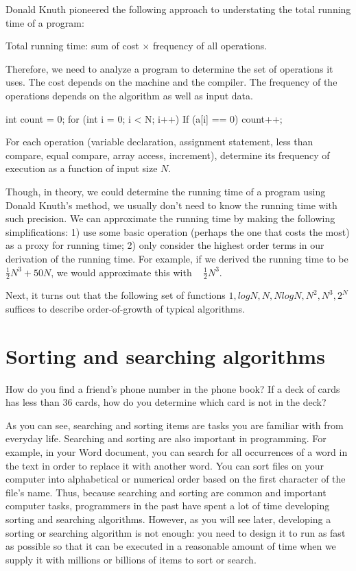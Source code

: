 Donald Knuth pioneered the following approach to understating the total running time of a program:

Total running time: sum of cost $\times$ frequency of all operations.

Therefore, we need to analyze a program to determine the set of operations it uses. The cost depends on the machine and the compiler. The frequency of the operations depends on the algorithm as well as input data. 

\begin{exercise}
\begin{code}
int count = 0;
for (int i = 0; i < N; i++)
	If (a[i] == 0)
		count++;
\end{code}

For each operation (variable declaration, assignment statement, less than compare, equal compare, array access, increment), determine its frequency of execution as a function of input size $N$.

\end{exercise}



Though, in theory, we could determine the running time of a program using Donald Knuth’s method, we usually don’t need to know the running time with such precision. We can approximate the running time by making the following simplifications: 1) use some basic operation (perhaps the one that costs the most) as a proxy for running time; 2) only consider the highest order terms in our derivation of the running time. For example, if we derived the running time to be $\frac{1}{2}N^3 + 50 N$, we would approximate this with ~ $\frac{1}{2}N^3$.

Next, it turns out that the following set of functions 
$1, logN, N, NlogN, N^2, N^3, 2^N$
suffices to describe order-of-growth of typical algorithms. 


\section{Sorting and searching algorithms}

How do you find a friend's phone number in the phone book? If a deck of cards has less than 36 cards, how do you determine which card is not in the deck?

As you can see, searching and sorting items are tasks you are familiar with from everyday life. Searching and sorting are also important in programming. For example, in your Word document, you can search for all occurrences of a word in the text in order to replace it with another word. You can sort files on your computer into alphabetical or numerical order based on the first character of the file's name. Thus, because searching and sorting are common and important computer tasks, programmers in the past have spent a lot of time developing sorting and searching algorithms. However, as you will see later, developing a sorting or searching algorithm is not enough: you need to design it to run as fast as possible so that it can be executed in a reasonable amount of time when we supply it with millions or billions of items to sort or search.


